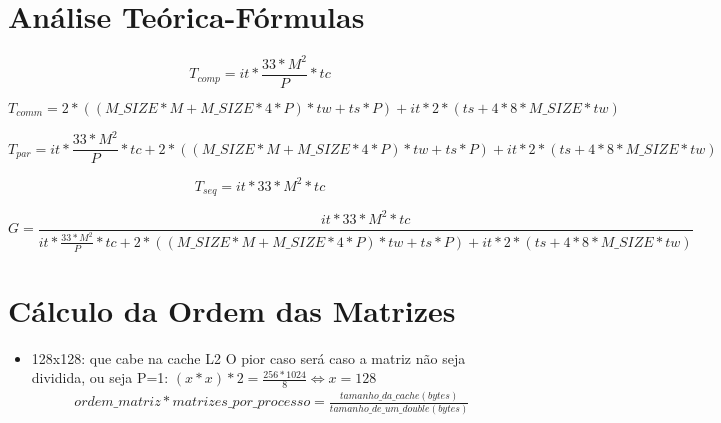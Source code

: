 \documentclass{article}
\begin{document}
\begin{appendices}
\section{Análise Teórica-Fórmulas} \label{formulas}
\begin{equation}
T_{comp} = it*\frac{33*M^2}{P}*tc \label{eq:Tcomp}
\end{equation}

\begin{equation}
T_{comm} = 2*((M\_SIZE*M+M\_SIZE*4*P)*tw+ts*P) +  it*2*(ts+4*8*M\_SIZE*tw) \label{eq:Tcomm}
\end{equation}

\begin{equation}
T_{par} = it*\frac{33*M^2}{P}*tc + 2*((M\_SIZE*M+M\_SIZE*4*P)*tw+ts*P) +  it*2*(ts+4*8*M\_SIZE*tw) \label{eq:Tpar}
\end{equation}

\begin{equation}
T_{seq} = it*33*M^2*tc \label{eq:Tseq}
\end{equation}

\begin{equation}
G=\frac{it*33*M^2*tc}{it*\frac{33*M^2}{P}*tc + 2*((M\_SIZE*M+M\_SIZE*4*P)*tw+ts*P) + it*2*(ts+4*8*M\_SIZE*tw)} \label{eq:G}
\end{equation}

\section{Cálculo da Ordem das Matrizes} \label{calOrdem}
\begin{itemize}
    \item 128x128: que cabe na cache L2 \newline
          O pior caso será caso a matriz não seja dividida, ou seja P=1: \newline
          $ (x * x)* 2 = \frac{256*1024}{8} \Leftrightarrow x = 128 $ \newline
          \begin{equation}
              \begin{split}
                   ordem\_matriz * matrizes\_por\_processo = \frac{tamanho\_da\_cache(bytes)}{tamanho\_de\_um\_double(bytes)}
              \end{split}
          \end{equation}


\end{itemize}
\end{appendices}
\end{document}
